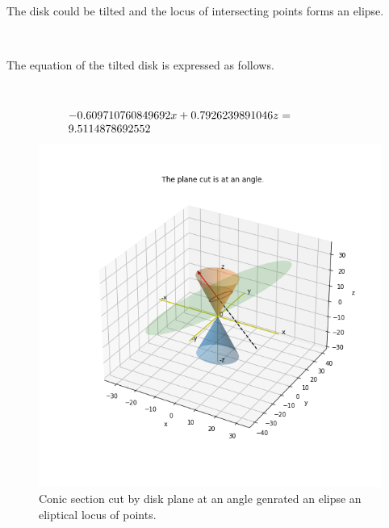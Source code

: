 \documentclass[10pt,a4paper,leqno]{article}
\begin{document}
\begin{CJK*}{UTF8}{gbsn}
\noindent The disk could be tilted and the locus of intersecting points forms an elipse.
 \par \ \par\noindent The equation of the tilted disk is expressed as follows.
 \par \ \par\begin{equation}
 \begin{minipage}{250pt}
                \begin{flushleft} $\displaystyle - 0.609710760849692 x + 0.7926239891046 z = 9.5114878692552$  \end{flushleft}
 \end{minipage}
 \end{equation}
\begin{figure}[H]
\centering\includegraphics[width=1\linewidth,height=0.7\textheight]{Data/fgr04.png}
\caption{Conic section cut by disk plane at an angle genrated an elipse an eliptical locus of points.}
\label{fig:Data/fgr04.png}
\end{figure}


\end{CJK*}
\end{document}

